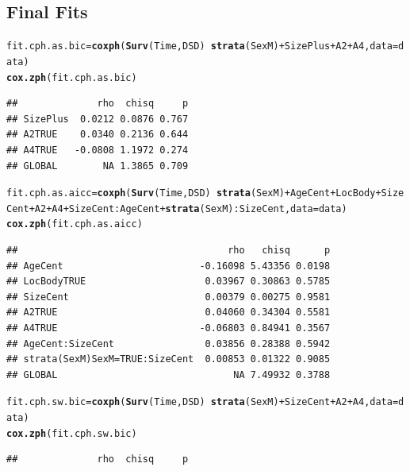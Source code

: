 \documentclass{article}\usepackage[]{graphicx}\usepackage[]{color}
\makeatletter
\newcommand{\hlopt}[1]{\textcolor[rgb]{0,0,0}{#1}}%
\newcommand{\hlstd}[1]{\textcolor[rgb]{0.345,0.345,0.345}{#1}}%
\newcommand{\hlkwb}[1]{\textcolor[rgb]{0.69,0.353,0.396}{#1}}%
\newcommand{\hlkwc}[1]{\textcolor[rgb]{0.333,0.667,0.333}{#1}}%
\newcommand{\hlkwd}[1]{\textcolor[rgb]{0.737,0.353,0.396}{\textbf{#1}}}%
\newenvironment{kframe}{%
 \def\at@end@of@kframe{}%
 \ifinner\ifhmode%
  \def\at@end@of@kframe{\end{minipage}}%
  \begin{minipage}{\columnwidth}%
 \fi\fi%
 \def\FrameCommand##1{\hskip\@totalleftmargin \hskip-\fboxsep
 \colorbox{shadecolor}{##1}\hskip-\fboxsep
     \hskip-\linewidth \hskip-\@totalleftmargin \hskip\columnwidth}%
 \MakeFramed {\advance\hsize-\width
   \@totalleftmargin\z@ \linewidth\hsize
   \@setminipage}}%
 {\par\unskip\endMakeFramed%
 \at@end@of@kframe}
\newenvironment{knitrout}{}{} %
\makeatother
\begin{document}
\subsection{Final Fits}
\begin{knitrout}
\color{fgcolor}\begin{kframe}
\begin{alltt}
\hlstd{fit.cph.as.bic} \hlkwb{=} \hlkwd{coxph}\hlstd{(}\hlkwd{Surv}\hlstd{(Time, DSD)} \hlopt{~} \hlkwd{strata}\hlstd{(SexM)} \hlopt{+} \hlstd{SizePlus} \hlopt{+} \hlstd{A2} \hlopt{+} \hlstd{A4,} \hlkwc{data} \hlstd{= data)}
\hlkwd{cox.zph}\hlstd{(fit.cph.as.bic)}
\end{alltt}
\begin{verbatim}
##              rho  chisq     p
## SizePlus  0.0212 0.0876 0.767
## A2TRUE    0.0340 0.2136 0.644
## A4TRUE   -0.0808 1.1972 0.274
## GLOBAL        NA 1.3865 0.709
\end{verbatim}
\begin{alltt}
\hlstd{fit.cph.as.aicc} \hlkwb{=} \hlkwd{coxph}\hlstd{(}\hlkwd{Surv}\hlstd{(Time, DSD)} \hlopt{~} \hlkwd{strata}\hlstd{(SexM)}\hlopt{+}\hlstd{AgeCent}\hlopt{+}\hlstd{LocBody}\hlopt{+}\hlstd{SizeCent}\hlopt{+}\hlstd{A2}\hlopt{+}\hlstd{A4}\hlopt{+}\hlstd{SizeCent}\hlopt{:}\hlstd{AgeCent}\hlopt{+}\hlkwd{strata}\hlstd{(SexM)}\hlopt{:}\hlstd{SizeCent,} \hlkwc{data} \hlstd{= data)}
\hlkwd{cox.zph}\hlstd{(fit.cph.as.aicc)}
\end{alltt}
\begin{verbatim}
##                                     rho   chisq      p
## AgeCent                        -0.16098 5.43356 0.0198
## LocBodyTRUE                     0.03967 0.30863 0.5785
## SizeCent                        0.00379 0.00275 0.9581
## A2TRUE                          0.04060 0.34304 0.5581
## A4TRUE                         -0.06803 0.84941 0.3567
## AgeCent:SizeCent                0.03856 0.28388 0.5942
## strata(SexM)SexM=TRUE:SizeCent  0.00853 0.01322 0.9085
## GLOBAL                               NA 7.49932 0.3788
\end{verbatim}
\begin{alltt}
\hlstd{fit.cph.sw.bic} \hlkwb{=} \hlkwd{coxph}\hlstd{(}\hlkwd{Surv}\hlstd{(Time, DSD)} \hlopt{~} \hlkwd{strata}\hlstd{(SexM)} \hlopt{+} \hlstd{SizeCent} \hlopt{+} \hlstd{A2} \hlopt{+} \hlstd{A4,} \hlkwc{data} \hlstd{= data)}
\hlkwd{cox.zph}\hlstd{(fit.cph.sw.bic)}
\end{alltt}
\begin{verbatim}
##              rho  chisq     p

\end{verbatim}
\end{kframe}
\end{knitrout}
\end{document}
